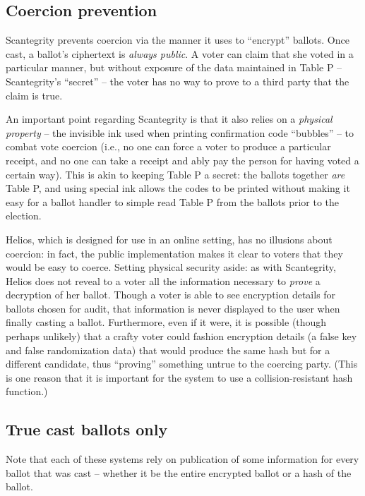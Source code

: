 \documentclass[10pt,twocolumn]{article}
\begin{document}
\subsection{Coercion prevention}

Scantegrity prevents coercion via the manner it uses to ``encrypt'' ballots. Once cast, a ballot's
ciphertext is \emph{always public}. A voter can claim that she voted in a particular manner, but
without exposure of the data maintained in Table P -- Scantegrity's ``secret'' -- the voter has no
way to prove to a third party that the claim is true.

An important point regarding Scantegrity is that it also relies on a \emph{physical property} -- the
invisible ink used when printing confirmation code ``bubbles'' -- to combat vote coercion (i.e., no
one can force a voter to produce a particular receipt, and no one can take a receipt and ably pay
the person for having voted a certain way). This is akin to keeping Table P a secret: the ballots
together \emph{are} Table P, and using special ink allows the codes to be printed without making it
easy for a ballot handler to simple read Table P from the ballots prior to the election.

Helios, which is designed for use in an online setting, has no illusions about coercion: in fact,
the public implementation makes it clear to voters that they would be easy to coerce. Setting
physical security aside: as with Scantegrity, Helios does not reveal to a voter all the
information necessary to \emph{prove} a decryption of her ballot. Though a voter is able to see
encryption details for ballots chosen for audit, that information is never displayed to the user
when finally casting a ballot. Furthermore, even if it were, it is possible (though perhaps
unlikely) that a crafty voter could fashion encryption details (a false key and false randomization
data) that would produce the same hash but for a different candidate, thus ``proving'' something
untrue to the coercing party. (This is one reason that it is important for the system to use a
collision-resistant hash function.)

\subsection{True cast ballots only}

Note that each of these systems rely on publication of some information for every ballot that was
cast -- whether it be the entire encrypted ballot or a hash of the ballot.
\end{document}

